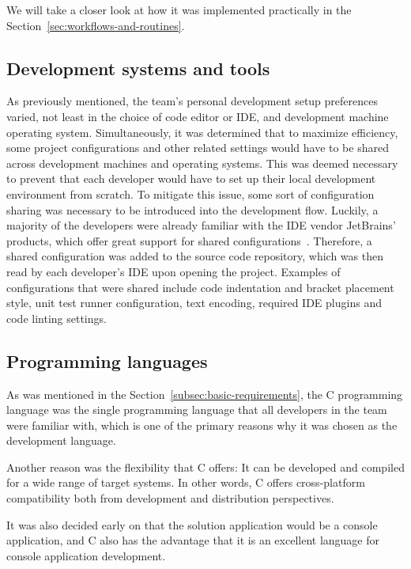 We will take a closer look at how it was implemented practically in the Section~\ref{sec:workflows-and-routines}.

\subsection{Development systems and tools}\label{subsec:development-systems-and-tools}

As previously mentioned, the team's personal development setup preferences varied, not least in the choice of code
editor or IDE, and development machine operating system.
Simultaneously, it was determined that to maximize efficiency, some project configurations and other related settings
would have to be shared across development machines and operating systems.
This was deemed necessary to prevent that each developer would have to set up their local development environment
from scratch.
To mitigate this issue, some sort of configuration sharing was necessary to be introduced into the development flow.
Luckily, a majority of the developers were already familiar with the IDE vendor JetBrains' products, which offer great
support for shared configurations~\cite{shared-config}.
Therefore, a shared configuration was added to the source code repository, which was then read by each developer's
IDE upon opening the project.
Examples of configurations that were shared include code indentation and bracket placement style, unit test runner
configuration, text encoding, required IDE plugins and code linting settings.

\subsection{Programming languages}\label{subsec:programming-languages}

As was mentioned in the Section~\ref{subsec:basic-requirements}, the C programming language was the single
programming language that all developers in the team were familiar with, which is one of the primary reasons why it was
chosen as the development language.

Another reason was the flexibility that C offers: It can be developed and compiled for a wide range of target systems.
In other words, C offers cross-platform compatibility both from development and distribution perspectives.

It was also decided early on that the solution application would be a console application, and C also has the advantage
that it is an excellent language for console application development.

